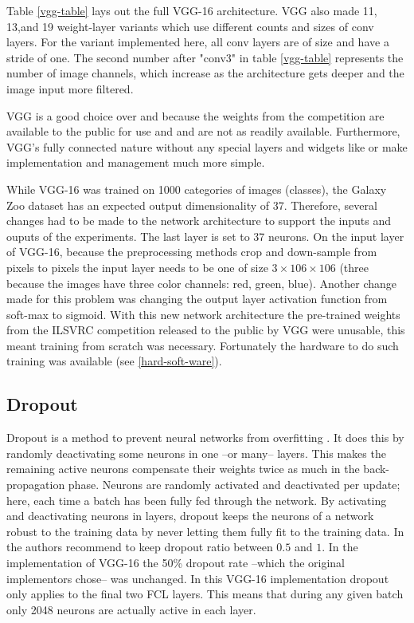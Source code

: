 Table \ref{vgg-table} lays out the full VGG-16 architecture. VGG also made 11, 13,and 19 weight-layer variants which use different counts and sizes of conv layers. For the variant implemented here, all conv layers are of size  and have a stride of one. The second number after "conv3" in table \ref{vgg-table} represents the number of image channels, which increase as the architecture gets deeper and the image input more filtered.

VGG is a good choice over \gnet and \anet because the weights from the competition are available to the public for use and \anet and \gnet are not as readily available. Furthermore, VGG's fully connected nature without any special layers and widgets like \anet or \gnet make implementation and management much more simple. %

While VGG-16 was trained on 1000 categories of images (classes), the Galaxy Zoo dataset has an expected output dimensionality of 37. Therefore, several changes had to be made to the network architecture to support the inputs and ouputs of the experiments. The last layer is set to 37 neurons. On the input layer of VGG-16, because the preprocessing methods crop and down-sample from  pixels to  pixels the input layer needs to be one of size $3 \times 106 \times 106$ (three because the images have three color channels: red, green, blue). Another change made for this problem was changing the output layer activation function from soft-max to sigmoid. With this new network architecture the pre-trained weights from the ILSVRC competition released to the public by VGG were unusable, this meant training from scratch was necessary. Fortunately the hardware to do such training was available (see \ref{hard-soft-ware}).

\subsection{Dropout}
Dropout is a method to prevent neural networks from overfitting \cite{dropout}. It does this by randomly deactivating some neurons in one --or many-- layers. This makes the remaining active neurons compensate their weights twice as much in the back-propagation phase. Neurons are randomly activated and deactivated per update; here, each time a batch has been fully fed through the network. By activating and deactivating neurons in layers, dropout keeps the neurons of a network robust to the training data by never letting them fully fit to the training data. In \cite{dropout} the authors recommend to keep dropout ratio between $0.5$ and $1$. In the implementation of VGG-16 the 50\% dropout rate --which the original implementors chose-- was unchanged. In this VGG-16 implementation dropout only applies to the final two FCL layers. This means that during any given batch only 2048 neurons are actually active in each layer.

